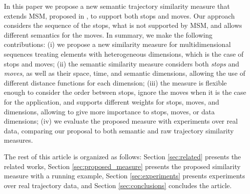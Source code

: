 \documentclass[12pt]{article}
\begin{document}



In this paper we propose a new semantic trajectory similarity measure that extends MSM, proposed in \cite{Furtado:TGIS12156}, to support both stops and moves. Our approach considers the sequence of the stops, what is not supported by MSM, and allows different semantics for the moves. 
In summary, we make the following contributions:
(i) we propose a new similarity measure for multidimensional sequences treating elements with heterogeneous dimensions, which is the case of stops and moves; (ii) the semantic similarity measure considers both \textit{stops} and \textit{moves}, as well as their space, time, and semantic dimensions, allowing the use of different distance functions for each dimension; (iii) the measure is flexible enough to consider the order between stops, ignore the moves when it is the case for the application, and supports different weights for stops, moves, and dimensions, allowing to give more importance to stops, moves, or data dimensions; (iv) we evaluate the proposed measure with experiments over real data, comparing our proposal to both semantic and raw trajectory similarity measures.

The rest of this article is organized as follows: Section \ref{sec:related} presents the related works, Section \ref{sec:proposed_measure} presents the proposed similarity measure with a running example, Section \ref{sec:experiments} presents experiments over real trajectory data, and Section \ref{sec:conclusions} concludes the article.
\end{document}
